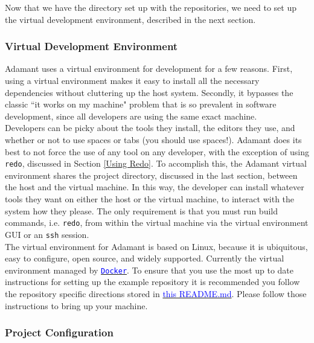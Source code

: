 Now that we have the directory set up with the repositories, we need to set up the virtual development environment, described in the next section.

\subsubsection{Virtual Development Environment} \label{Virtual Development Environment}

Adamant uses a virtual environment for development for a few reasons. First, using a virtual environment makes it easy to install all the necessary dependencies without cluttering up the host system. Secondly, it bypasses the classic ``it works on my machine" problem that is so prevalent in software development, since all developers are using the same exact machine. \\

Developers can be picky about the tools they install, the editors they use, and whether or not to use spaces or tabs (you should use spaces!). Adamant does its best to not force the use of any tool on any developer, with the exception of using \texttt{redo}, discussed in Section \ref{Using Redo}. To accomplish this, the Adamant virtual environment shares the project directory, discussed in the last section, between the host and the virtual machine. In this way, the developer can install whatever tools they want on either the host or the virtual machine, to interact with the system how they please. The only requirement is that you must run build commands, i.e. \texttt{redo}, from within the virtual machine via the virtual environment GUI or an \texttt{ssh} session. \\

The virtual environment for Adamant is based on Linux, because it is ubiquitous, easy to configure, open source, and widely supported. Currently the virtual environment managed by \href{https://www.docker.com/}{\texttt{\textcolor{blue}{Docker}}}. To ensure that you use the most up to date instructions for setting up the example repository it is recommended you follow the repository specific directions stored in \href{https://github.com/lasp/adamant_example/blob/main/docker/README.md}{\textcolor{blue}{this README.md}}. Please follow those instructions to bring up your machine. \\

\subsubsection{Project Configuration} \label{Project Configuration}

